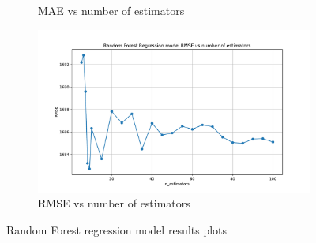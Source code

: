 \begin{figure}[!htbp]
\begin{subfigure}[b]{0.45\textwidth}
        \caption{MAE vs number of estimators}
        \label{Fig: RF MSE vs nn}
    \end{subfigure}
    \hfill
    \begin{subfigure}[b]{0.45\textwidth}
        \includegraphics[width=\textwidth]{../regression_model/plots/RandomForest/Random Forest Regression model RMSE vs n_estimators.pdf}
        \caption{RMSE vs number of estimators}
        \label{Fig: RF RMSE vs nn}
    \end{subfigure}
    \caption[Random Forest metric results]{Random Forest regression model results plots}
\end{figure}

